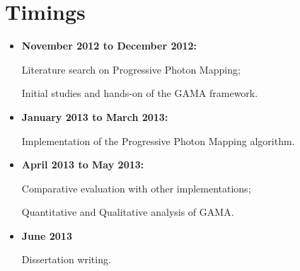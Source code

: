 \section{Timings}

\begin{itemize}
  \item \textbf{November 2012 to December 2012:}

    \sudoindent Literature search on Progressive Photon Mapping;

    \sudoindent Initial studies and hands-on of the GAMA framework.


  \item \textbf{January 2013 to March 2013:}

    \sudoindent Implementation of the Progressive Photon Mapping algorithm.


  \item \textbf{April 2013 to May 2013:}

    \sudoindent Comparative evaluation with other implementations;

    \sudoindent Quantitative and Qualitative analysis of GAMA.


  \item \textbf{June 2013}

      \sudoindent Dissertation writing.
\end{itemize}

